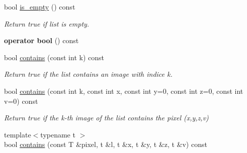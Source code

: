 \begin{DoxyCompactItemize}
\item 
\hypertarget{structcimg__library_1_1_c_img_list_a71ab7254a085eec7f25fc92145e35fa4}{bool \hyperlink{structcimg__library_1_1_c_img_list_a71ab7254a085eec7f25fc92145e35fa4}{is\-\_\-empty} () const }\label{structcimg__library_1_1_c_img_list_a71ab7254a085eec7f25fc92145e35fa4}

\begin{DoxyCompactList}\small\item\em Return {\ttfamily true} if list is empty. \end{DoxyCompactList}\item 
\hypertarget{structcimg__library_1_1_c_img_list_a5a1fc06d107e27c73a06a018f6ebdb6f}{{\bfseries operator bool} () const }\label{structcimg__library_1_1_c_img_list_a5a1fc06d107e27c73a06a018f6ebdb6f}

\item 
\hypertarget{structcimg__library_1_1_c_img_list_acdcd745d708556d3dfbbc3bd59a20408}{bool \hyperlink{structcimg__library_1_1_c_img_list_acdcd745d708556d3dfbbc3bd59a20408}{contains} (const int k) const }\label{structcimg__library_1_1_c_img_list_acdcd745d708556d3dfbbc3bd59a20408}

\begin{DoxyCompactList}\small\item\em Return {\ttfamily true} if the list contains an image with indice k. \end{DoxyCompactList}\item 
\hypertarget{structcimg__library_1_1_c_img_list_a30c53742a1ac73335a69196072bd12ec}{bool \hyperlink{structcimg__library_1_1_c_img_list_a30c53742a1ac73335a69196072bd12ec}{contains} (const int k, const int x, const int y=0, const int z=0, const int v=0) const }\label{structcimg__library_1_1_c_img_list_a30c53742a1ac73335a69196072bd12ec}

\begin{DoxyCompactList}\small\item\em Return {\ttfamily true} if the k-\/th image of the list contains the pixel (x,y,z,v) \end{DoxyCompactList}\item 
\hypertarget{structcimg__library_1_1_c_img_list_af10d34722e0907f6c86f09fabcd0ff1c}{{\footnotesize template$<$typename t $>$ }\\bool \hyperlink{structcimg__library_1_1_c_img_list_af10d34722e0907f6c86f09fabcd0ff1c}{contains} (const T \&pixel, t \&l, t \&x, t \&y, t \&z, t \&v) const }\label{structcimg__library_1_1_c_img_list_af10d34722e0907f6c86f09fabcd0ff1c}


\end{DoxyCompactItemize}
